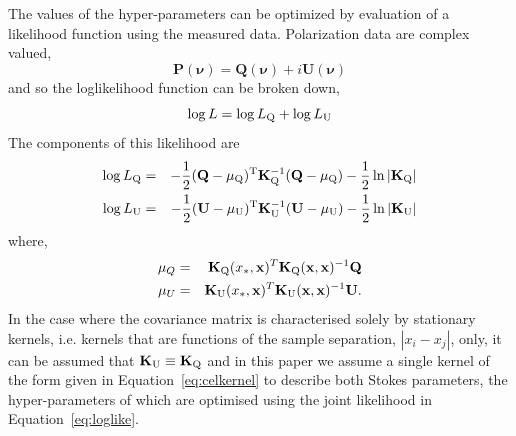 \documentclass[fleqn,usenatbib]{mnras}
\begin{document}
The values of the hyper-parameters can be optimized by evaluation of a likelihood function using the measured data. Polarization data are complex valued,
%
\begin{equation}
\mathbf{P}(\mathbf{\nu}) = \mathbf{Q}(\mathbf{\nu}) + i\mathbf{U}(\mathbf{\nu})
\end{equation}
%
and so the loglikelihood function can be broken down,
%
\begin{equation}
\label{eq:loglike}
\log L = \log L_{\rm Q} + \log L_{\rm U}
\end{equation}
%
The components of this likelihood are
%
\begin{eqnarray}
\log L_{\rm Q} &=& -\frac{1}{2}(\mathbf{Q} - \mathbf{\mu}_{\rm Q})^{\rm T}\mathbf{K}_{\rm Q}^{-1}(\mathbf{Q} - \mathbf{\mu}_{\rm Q}) - \frac{1}{2}\ln |\mathbf{K}_{\rm Q}|\\
\log L_{\rm U} &=& -\frac{1}{2}(\mathbf{U} - \mathbf{\mu}_{\rm U})^{\rm T}\mathbf{K}_{\rm U}^{-1}(\mathbf{U} - \mathbf{\mu}_{\rm U}) - \frac{1}{2}\ln |\mathbf{K}_{\rm U}|
\end{eqnarray}
%
where,
%
\begin{eqnarray}
\mathbf{\mu}_{Q} &=& \mathbf{K}_{\rm Q}(x_{\ast},\mathbf{x})^T \mathbf{K}_{\rm Q}(\mathbf{x},\mathbf{x})^{-1} \mathbf{Q}\\
\mathbf{\mu}_{U} &=& \mathbf{K}_{\rm U}(x_{\ast},\mathbf{x})^T \mathbf{K}_{\rm U}(\mathbf{x},\mathbf{x})^{-1} \mathbf{U}.
\end{eqnarray}
%
In the case where the covariance matrix is characterised solely by stationary kernels, i.e. kernels that are functions of the sample separation, $|x_i - x_j|$, only, it can be assumed that $\mathbf{K}_{\rm U}\equiv \mathbf{K}_{\rm Q}$ and in this paper we assume a single kernel of the form given in Equation~\ref{eq:celkernel} to describe both Stokes parameters, the hyper-parameters of which are optimised using the joint likelihood in Equation~\ref{eq:loglike}.


\end{document}
